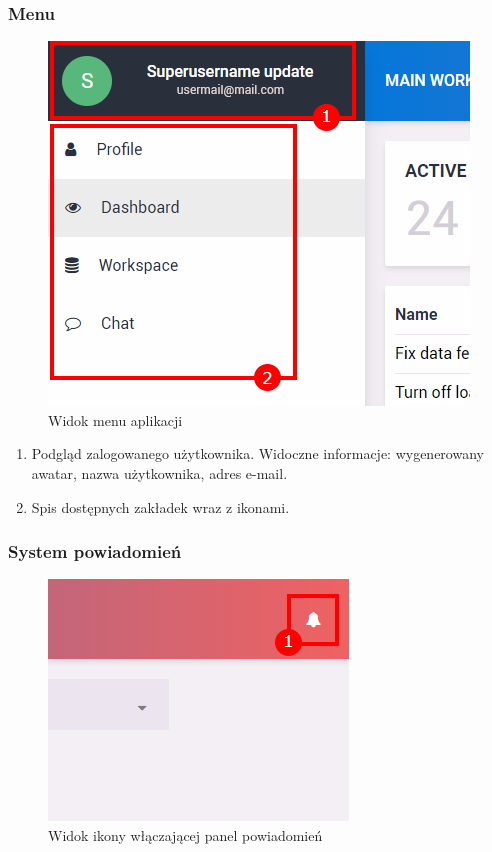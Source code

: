\documentclass[eng,printmode]{mgr}
\begin{document}
\subsubsection{Menu}
\begin{figure}[H]
  \begin{center}
  \includegraphics[scale=0.8]{menu}
  \end{center}
  \caption{Widok menu aplikacji}
\end{figure}

\begin{enumerate}
  \item Podgląd zalogowanego użytkownika. Widoczne informacje: wygenerowany awatar, nazwa użytkownika, adres e-mail.
  \item Spis dostępnych zakładek wraz z ikonami.
\end{enumerate}
\newpage

\subsubsection{System powiadomień}
\begin{figure}[H]
  \begin{center}
  \includegraphics[scale=0.8]{notification}
  \end{center}
  \caption{Widok ikony włączającej panel powiadomień}
\end{figure}
\end{document}
